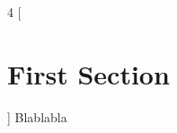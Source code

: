 \documentclass[a3paper,margin=4pt,landscape]{article}
\begin{document}
\begin{multicols}{4}
[
\section{First Section}
]
Blablabla

\end{multicols}
\end{document}

